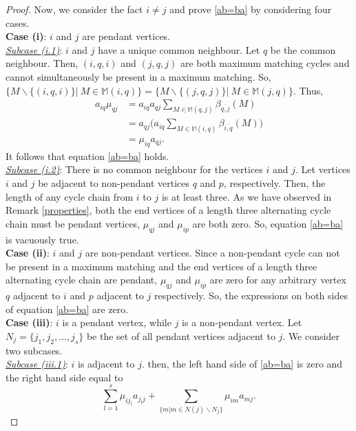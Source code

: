 \documentclass[notitlepage,12pt,reqno]{amsart}
\numberwithin{equation}{section}
\begin{document}
\begin{proof}
Now, we consider the fact $i\neq j$ and prove \ref{ab=ba} by considering four cases.\\
{\bf Case (i)}: $i$ and $j$ are pendant vertices.\\ 
\underline{{\it Subcase \rm{(i.1)}}}: $i$ and $j$ have a unique common neighbour. Let $q$ be the common neighbour. Then, $(i,q,i)$ and $(j,q,j)$ are both maximum matching cycles and cannot simultaneously be present in a maximum
matching. So, $\{M\backslash \{(i,q,i)\}\vert ~M\in \mathbb{M}(i,q)\}=\{M\backslash \{(j,q,j)\}\vert ~M\in \mathbb{M}(j,q)\}$. Thus,
\begin{align*}
a_{iq}\mu _{qj}& =a_{iq}a_{qj}\sum _{M\in \mathbb{M}(q,j)}\beta _{\overline{q,j}}(M) \\
 &= a_{qj}\Big (a_{iq}\sum _{M\in \mathbb{M}(i,q)}\beta _{\overline{i,q}}(M)\Big ) \\
 &= \mu _{iq}a_{qj}. 
\end{align*} 
It follows that equation \ref{ab=ba} holds.\\
\underline{{\it Subcase \rm{(i.2)}}}: There is no common neighbour for the vertices $i$ and $j$. Let vertices $i$ and $j$ be adjacent to non-pendant vertices $q$ and $p$, respectively. Then, the length of any cycle chain from $i$ to $j$ is at least three. As we have observed in Remark \ref{properties}, both the end vertices of a length three alternating cycle chain must be pendant vertices, $\mu _{qj}$ and $\mu _{ip}$ are both zero. So, equation \ref{ab=ba} is vacuously true.\\
{\bf Case (ii)}: $i$ and $j$ are non-pendant vertices. Since a non-pendant cycle can not be present in a maximum matching and the end vertices of a length three alternating cycle chain are pendant, $\mu _{qj}$ and $\mu _{ip}$ are zero for any arbitrary vertex $q$ adjacent to $i$ and $p$ adjacent to $j$ respectively. So, the expressions on both sides of equation \ref{ab=ba} are zero.\\
{\bf Case (iii)}: $i$ is a pendant vertex, while $j$ is a non-pendant vertex. Let $N_j=\{j_1,j_2,\ldots ,j_s\}$ be the set of all pendant vertices adjacent to $j$. We consider two subcases.\\
\underline{{\it Subcase \rm{(iii.1)}}}: $i$ is adjacent to $j$. then, the left hand side of \ref{ab=ba} is zero and the right hand side equal to
\begin{equation}\label{split}
\sum _{l=1}^s\mu _{ij_l} a_{j_lj} + \sum _{\{m\vert m \in N(j)\backslash N_j\}}\mu _{im} a_{mj}.
\end{equation}

\end{proof}
\end{document}
